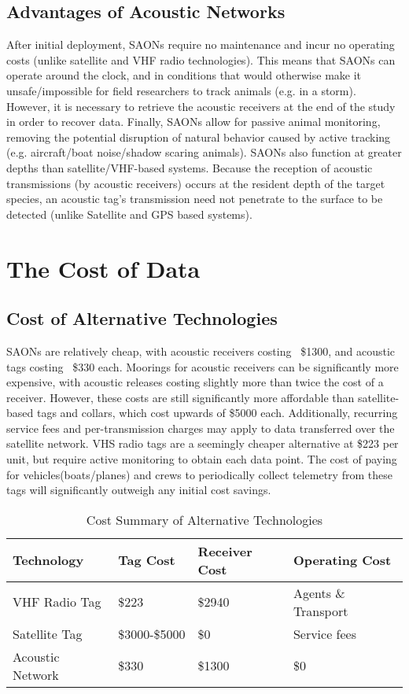 \subsection{Advantages of Acoustic Networks}
After initial deployment, SAONs require no maintenance and incur no operating costs (unlike satellite and VHF radio technologies).  This means that SAONs can operate around the clock, and in conditions that would otherwise make it unsafe/impossible for field researchers to track animals (e.g. in a storm)\cite{Heupel2006}.  However, it is necessary to retrieve the acoustic receivers at the end of the study in order to recover data\cite{Heupel2006}.  Finally, SAONs allow for passive animal monitoring, removing the potential disruption of natural behavior caused by active tracking (e.g. aircraft/boat noise/shadow scaring animals)\cite{Heupel2006}.  SAONs also function at greater depths than satellite/VHF-based systems.  Because the reception of acoustic transmissions (by acoustic receivers) occurs at the resident depth of the target species, an acoustic tag's transmission need not penetrate to the surface to be detected (unlike Satellite and GPS based systems).




\section{The Cost of Data}
\subsection{Cost of Alternative Technologies}
SAONs are relatively cheap, with acoustic receivers costing ~\$1300, and acoustic tags costing ~\$330 each.  Moorings for acoustic receivers can be significantly more expensive, with acoustic releases costing slightly more than twice the cost of a receiver.  However, these costs are still significantly more affordable than satellite-based tags and collars, which cost upwards of \$5000 each\cite{wildlifetracking}.  Additionally, recurring service fees and per-transmission charges may apply to data transferred over the satellite network.  VHS radio tags are a seemingly cheaper alternative at \$223 per unit, but require active monitoring to obtain each data point.  The cost of paying for vehicles(boats/planes) and crews to periodically collect telemetry from these tags will significantly outweigh any initial cost savings.

\begin{table}[h!]
		\label{CostAltTech}
		\begin{tabular}{l l l l}
Technology&Tag Cost&Receiver Cost&Operating Cost\\
\hline
			VHF Radio Tag		 & \$223\cite{telonicsFIS-550}           & \$2940\cite{telonicsTR-5}  & Agents \& Transport\\
			Satellite Tag 	     & \$3000-\$5000\cite{wildlifetracking}  & \$0    					  & Service fees\\
			Acoustic Network 	 & \$330         						 & \$1300 					  & \$0\\
		\end{tabular}
		\caption{Cost Summary of Alternative Technologies}
\end{table}

